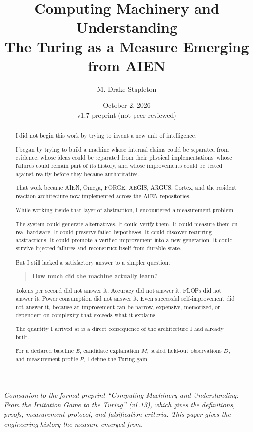 \documentclass[11pt]{article}
\title{
    \textbf{Computing Machinery and Understanding}\\[0.5em]
    \large The Turing as a Measure Emerging from AIEN
}
\author{M. Drake Stapleton}
\date{October 2, 2026\\v1.7 preprint (not peer reviewed)}
\begin{document}
\maketitle

\noindent\textit{Companion to the formal preprint ``Computing Machinery and Understanding: From the Imitation Game to the Turing'' (v1.13), which gives the definitions, proofs, measurement protocol, and falsification criteria. This paper gives the engineering history the measure emerged from.}

\begin{abstract}
I did not begin this work by trying to invent a new unit of intelligence.

I began by trying to build a machine whose internal claims could be separated from evidence, whose ideas could be separated from their physical implementations, whose failures could remain part of its history, and whose improvements could be tested against reality before they became authoritative.

That work became AIEN, Omega, FORGE, AEGIS, ARGUS, Cortex, and the resident reaction architecture now implemented across the AIEN repositories.

While working inside that layer of abstraction, I encountered a measurement problem.

The system could generate alternatives. It could verify them. It could measure them on real hardware. It could preserve failed hypotheses. It could discover recurring abstractions. It could promote a verified improvement into a new generation. It could survive injected failures and reconstruct itself from durable state.

But I still lacked a satisfactory answer to a simpler question:

\begin{quote}
\textbf{How much did the machine actually learn?}
\end{quote}

Tokens per second did not answer it. Accuracy did not answer it. FLOPs did not answer it. Power consumption did not answer it. Even successful self-improvement did not answer it, because an improvement can be narrow, expensive, memorized, or dependent on complexity that exceeds what it explains.

The quantity I arrived at is a direct consequence of the architecture I had already built.

For a declared baseline \(B\), candidate explanation \(M\), sealed held-out observations \(D\), and measurement profile \(P\), I define the Turing gain


\end{abstract}
\end{document}
